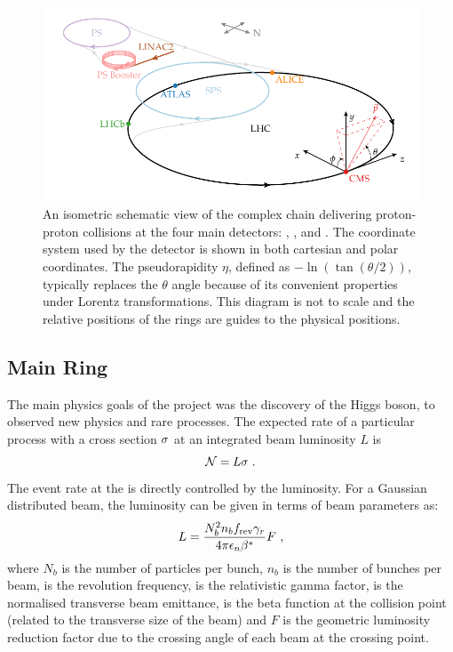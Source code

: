 \begin{figure}[htb]
    \centering
    \includegraphics{diagrams/tikz/lhc_complex/lhc_complex.pdf}
    \caption[Schematic view of the LHC complex.]{
        An isometric schematic view of the \LHC complex chain delivering
        proton-proton collisions at the four main detectors: \LHCb, \ATLAS,
        \ALICE and \CMS. The coordinate system used by the \CMS detector is
        shown in both cartesian and polar coordinates. The pseudorapidity
        $\eta$, defined as $-\ln(\tan(\theta/2))$, typically replaces the
        $\theta$ angle because of its convenient properties under Lorentz
        transformations. This diagram is not to scale and the relative
        positions of the rings are guides to the physical positions.
    }
    \label{fig:LHC-Complex}
\end{figure}


\subsection{\LHC Main Ring}

The main physics goals of the \LHC project was the discovery of the Higgs
boson, to observed new physics and rare \SM processes. The expected rate of a
particular process with a cross section $\sigma$ at an integrated beam luminosity
$L$ is
%
\begin{equation}
    \mathcal{N} = L \sigma \ .
\end{equation}
%
The event rate at the \LHC is directly controlled by the luminosity. For a
Gaussian distributed beam, the luminosity can be given in terms of beam
parameters as:
%
\begin{equation}
    \label{eq:beam-lumi}
    L = \frac{N_b^2 n_bf_{\mathrm{rev}}\gamma_{r}}{4\pi\epsilon_n\beta^*} F\ ,
\end{equation}
%
where $N_b$ is the number of particles per bunch, $n_b$ is the number of
bunches per beam, \frev is the revolution frequency, \relgamma is the
relativistic gamma factor, \emitt is the normalised transverse beam emittance,
\bstar is the beta function at the collision point (related to the transverse
size of the beam) and $F$ is the geometric luminosity reduction factor due to
the crossing angle of each beam at the crossing point.

